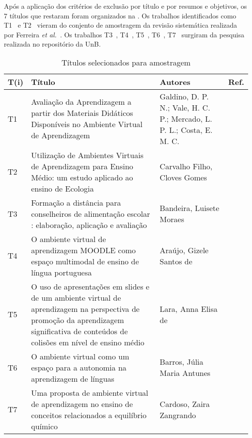 Após a aplicação dos critérios de exclusão por título e por resumos e objetivos, os 7 títulos que restaram foram organizados na . Os trabalhos identificados como T1~\cite{t1@ead} e T2~\cite{t2@ead} vieram do conjento de amostragem da revisão sistemática realizada por Ferreira \emph{et al.}~\cite{Ferreira@2017}. Os trabalhos T3~\cite{t3@ead}, T4~\cite{t4@ead}, T5~\cite{t5@ead}, T6~\cite{t6@ead}, T7~\cite{t7@ead} surgiram da pesquisa realizada no repositório da UnB.

\begin{table}[ht!]
  \footnotesize
  \centering
  \caption{Títulos selecionados para amostragem}
  \label{tab:trab}
  \begin{tabular}{|l|>{\raggedright\arraybackslash}p{9cm}|>{\raggedright\arraybackslash}p{4cm}|c|} 
    \toprule 
     T(i) & Título & Autores & Ref.  \\ 
    \midrule 
        T1 & Avaliação da Aprendizagem a partir dos Materiais Didáticos Disponíveis no Ambiente Virtual de Aprendizagem & Galdino, D. P. N.; Vale, H. C. P.; Mercado, L. P. L.; Costa, E. M. C.  &  ~\cite{t1@ead} \\ \hline 
        T2 & Utilização de Ambientes Virtuais de Aprendizagem para Ensino Médio: um estudo aplicado ao ensino de Ecologia & Carvalho Filho, Cloves Gomes & ~\cite{t2@ead}\\ \hline
        T3 & Formação a distância para conselheiros de alimentação escolar : elaboração, aplicação e avaliação & Bandeira, Luisete Moraes & ~\cite{t3@ead} \\ \hline
        T4 & O ambiente virtual de aprendizagem MOODLE como espaço multimodal de ensino de língua portuguesa & Araújo, Gizele Santos de & ~\cite{t4@ead} \\ \hline
        T5 & O uso de apresentações em slides e de um ambiente virtual de aprendizagem na perspectiva de promoção da aprendizagem significativa de conteúdos de colisões em nível de ensino médio & Lara, Anna Elisa de  & ~\cite{t5@ead} \\ \hline
        T6 & O ambiente virtual como um espaço para a autonomia na aprendizagem de línguas  & Barros, Júlia Maria Antunes & ~\cite{t6@ead} \\ \hline
        T7 & Uma proposta de ambiente virtual de aprendizagem no ensino de conceitos relacionados a equilíbrio químico  & Cardoso, Zaira Zangrando & ~\cite{t7@ead} \\
    \bottomrule 
\end{tabular}
\end{table}
\vspace{2mm}

